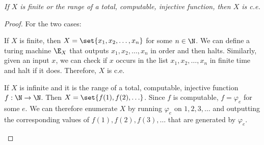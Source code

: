 \begin{problem}
\begin{answer}
    \emph{
      If $X$ is finite or the range of a total, computable, injective function,
      then $X$ is c.e.
    }
    
    \begin{proof}
      For the two cases:
      \begin{enumarabic}
        \item If $X$ is finite, then $X = \set{x_1, x_2, \ldots, x_n}$ for some $n \in \N$.
        We can define a turing machine $\E_X$ that outputs $x_1, x_2, \ldots, x_n$
        in order and then halts.
        Similarly, given an input $x$, we can check if $x$ occurs in the list
        $x_1, x_2, \ldots, x_n$ in finite time and halt if it does.
        Therefore, $X$ is c.e.

        \item If $X$ is infinite and it is the range of a
        total, computable, injective function $f: \N \to \N$.
        Then $X = \set{f(1), f(2), \ldots}$.
        Since $f$ is computable, $f = \varphi_{e}$ for some $e$.
        We can therefore enumerate $X$ by running $\varphi_e$
        on $1, 2, 3, \ldots$ and outputting the corresponding values
        of $f(1), f(2), f(3), \ldots$ that are generated by $\varphi_e$.
      \end{enumarabic}
    \end{proof}
  \end{answer}
\end{problem}
